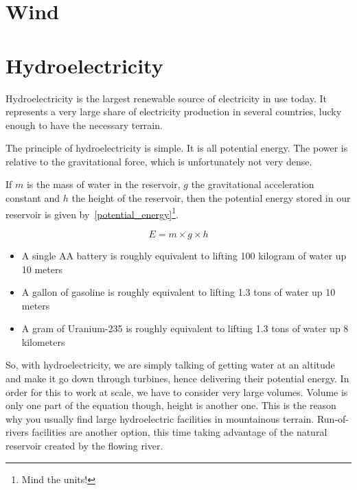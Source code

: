 \section{Wind}

\blindtext

\section{Hydroelectricity}

Hydroelectricity is the largest renewable source of electricity in use today. It represents a very large share of electricity production in several countries, lucky enough to have the necessary terrain.

The principle of hydroelectricity is simple. It is all potential energy. The power is relative to the gravitational force, which is unfortunately not very dense.

\begin{kaobox}

If $m$ is the mass of water in the reservoir, $g$ the gravitational acceleration constant and $h$ the height of the reservoir, then the potential energy stored in our reservoir is given by~\ref{potential_energy}\footnote{Mind the units!}.

\begin{equation}\label{potential_energy}
E = m \times g \times h
\end{equation}



\begin{itemize}
\item A single AA battery is roughly equivalent to lifting 100 kilogram of water up 10 meters
\item A gallon of gasoline is roughly equivalent to lifting 1.3 tons of water up 10 meters
\item A gram of Uranium-235 is roughly equivalent to lifting 1.3 tons of water up 8 kilometers
\end{itemize}

\end{kaobox}

So, with hydroelectricity, we are simply talking of getting water at an altitude and make it go down through turbines, hence delivering their potential energy. In order for this to work at scale, we have to consider very large volumes. Volume is only one part of the equation though, height is another one. This is the reason why you usually find large hydroelectric facilities in mountainous terrain. Run-of-rivers facilities are another option, this time taking advantage of the natural reservoir created by the flowing river.

